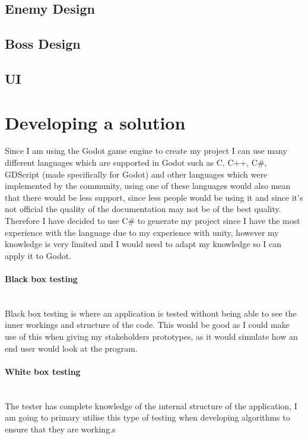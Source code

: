 \documentclass{article}
\newcommand{\parBr}{\vspace{5mm}}%
\newcommand{\myparagraph}[1]{\paragraph{#1}\mbox{}\\} %
\begin{document}
\subsection{Enemy Design}

\subsection{Boss Design}

\subsection{UI}

\section{Developing a solution}
Since I am using the Godot game engine to create my project I can use many different languages which are supported in Godot such as C, C++, C\#, GDScript (made specifically for Godot) and other languages which were implemented by the community, using one of these languages would also mean that there would be less support, since less people would be using it and since it's not official the quality of the documentation may not be of the best quality. Therefore I have decided to use C\# to generate my project since I have the most experience with the language due to my experience with unity, however my knowledge is very limited and I would need to adapt my knowledge so I can apply it to Godot. 

\parBr

\myparagraph{Black box testing}
Black box testing is where an application is tested without being able to see the inner workings and structure of the code. This would be good as I could make use of this when giving my stakeholders prototypes, as it would simulate how an end user would look at the program.

\parBr

\myparagraph{White box testing} 
The tester has complete knowledge of the internal structure of the application, I am going to primary utilise this type of testing when developing algorithms to ensure that they are working.s
\end{document}
